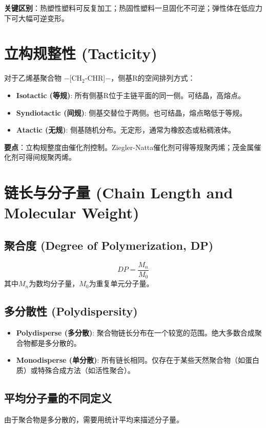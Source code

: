 \documentclass[12pt,a4paper]{ctexart}
\begin{document}
\textbf{关键区别}：热塑性塑料可反复加工；热固性塑料一旦固化不可逆；弹性体在低应力下可大幅可逆变形。

\section{立构规整性 (Tacticity)}

对于乙烯基聚合物 $-$[CH$_2$-CHR]$-$，侧基R的空间排列方式：

\begin{itemize}
    \item \textbf{Isotactic (等规)}: 所有侧基R位于主链平面的同一侧。可结晶，高熔点。
    \item \textbf{Syndiotactic (间规)}: 侧基交替位于两侧。也可结晶，熔点略低于等规。
    \item \textbf{Atactic (无规)}: 侧基随机分布。无定形，通常为橡胶态或粘稠液体。
\end{itemize}


\textbf{要点}：立构规整度由催化剂控制。Ziegler-Natta催化剂可得等规聚丙烯；茂金属催化剂可得间规聚丙烯。

\section{链长与分子量 (Chain Length and Molecular Weight)}

\subsection{聚合度 (Degree of Polymerization, DP)}
\[
DP = \frac{M_n}{M_0}
\]
其中$M_n$为数均分子量，$M_0$为重复单元分子量。

\subsection{多分散性 (Polydispersity)}
\begin{itemize}
    \item \textbf{Polydisperse (多分散)}: 聚合物链长分布在一个较宽的范围。绝大多数合成聚合物都是多分散的。
    \item \textbf{Monodisperse (单分散)}: 所有链长相同。仅存在于某些天然聚合物（如蛋白质）或特殊合成方法（如活性聚合）。
\end{itemize}

\subsection{平均分子量的不同定义}
由于聚合物是多分散的，需要用统计平均来描述分子量。
\end{document}
